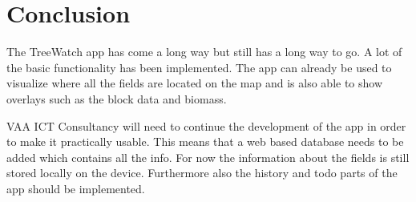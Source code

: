 \section{Conclusion}
The TreeWatch app has come a long way but still has a long way to go. A lot of the basic functionality has been implemented. The app can already be used to visualize where all the fields are located on the map and is also able to show overlays such as the block data and biomass.

VAA ICT Consultancy will need to continue the development of the app in order to make it practically usable. This means that a web based database needs to be added which contains all the info. For now the information about the fields is still stored locally on the device. Furthermore also the history and todo parts of the app should be implemented.